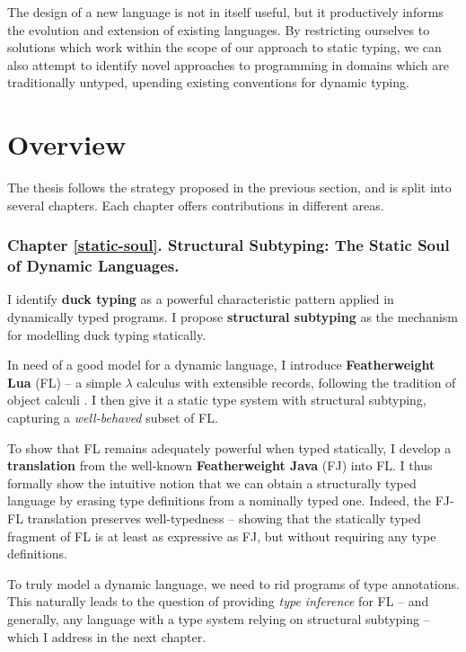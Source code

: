 The design of a new language is not in itself useful, but it productively informs the evolution and extension of existing languages.
By restricting ourselves to solutions which work within the scope of our approach to static typing, we can also attempt to identify novel approaches to programming in domains which are traditionally untyped, upending existing conventions for dynamic typing. 

\section{Overview}

The thesis follows the strategy proposed in the previous section, and is split into several chapters. Each chapter offers contributions in different areas.

\subsubsection{Chapter \ref{static-soul}. Structural Subtyping: The Static Soul of Dynamic Languages.} 

I identify \textbf{duck typing} as a powerful characteristic pattern applied in dynamically typed programs. I propose \textbf{structural subtyping} as the mechanism for modelling duck typing statically. 

In need of a good model for a dynamic language, I introduce \textbf{Featherweight Lua} (FL) -- a simple $\lambda$ calculus with extensible records, following the tradition of object calculi \cite{abadi-cardelli-object-calculus}. I then give it a static type system with structural subtyping, capturing a \emph{well-behaved} subset of FL.

To show that FL remains adequately powerful when typed statically, I develop a \textbf{translation} from the well-known \textbf{Featherweight Java} (FJ) into FL. 
I thus formally show the intuitive notion that we can obtain a structurally typed language by erasing type definitions from a nominally typed one.
Indeed, the FJ-FL translation preserves well-typedness -- showing that the statically typed fragment of FL is at least as expressive as FJ, but without requiring any type definitions. 

To truly model a dynamic language, we need to rid programs of type annotations. This naturally leads to the question of providing \emph{type inference} for FL -- and generally, any language with a type system relying on structural subtyping -- which I address in the next chapter.

